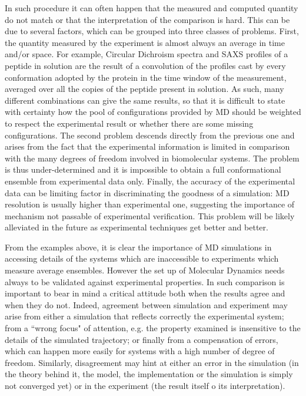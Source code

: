 In such procedure it can often happen that the measured and computed quantity do not match or that the interpretation of the comparison is hard. This can be due to several factors, which can be grouped into three classes of problems.
%
First, the quantity measured by the experiment is almost always an average in time and/or space. For example, Circular Dichroism spectra and SAXS profiles of a peptide in solution are the result of a convolution of the profiles cast by every conformation adopted by the protein in the time window of the measurement, averaged over all the copies of the peptide present in solution. As such, many different combinations can give the same results, so that it is difficult to state with certainty how the pool of configurations provided by MD should be weighted to respect the experimental result or whether there are some missing configurations.
%
The second problem descends directly from the previous one and arises from the fact that the experimental information is limited in comparison with the many degrees of freedom involved in biomolecular systems. The problem is thus under-determined and it is impossible to obtain a full conformational ensemble from experimental data only.
%
Finally, the accuracy of the experimental data can be limiting factor in discriminating the goodness of a simulation: MD resolution is usually higher than experimental one, suggesting the importance of mechanism not passable of experimental verification. This problem will be likely alleviated in the future as experimental techniques get better and better.

From the examples above, it is clear the importance of MD simulations in accessing details of the systems which are inaccessible to experiments which measure average ensembles. However the set up of Molecular Dynamics needs always to be validated against experimental properties.
%
In such comparison is important to bear in mind a critical attitude both when the results agree and when they do not.
%
Indeed, agreement between simulation and experiment may arise from either a simulation that reflects correctly the experimental system; from a ``wrong focus" of attention, e.g. the property examined is insensitive to the details of the simulated trajectory; or finally from a compensation of errors, which can happen more easily for systems with a high number of degree of freedom.
Similarly, disagreement may hint at either an error in the simulation (in the theory behind it, the model, the implementation or the simulation is simply not converged yet) or in the experiment (the result itself o its interpretation).


